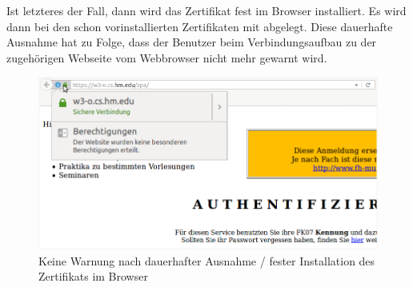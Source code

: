\noindent
Ist letzteres der Fall, dann wird das Zertifikat fest im Browser installiert. Es wird dann bei den schon vorinstallierten Zertifikaten mit abgelegt. Diese dauerhafte Ausnahme hat zu Folge, dass der Benutzer beim Verbindungsaufbau zu der zugehörigen Webseite vom Webbrowser nicht mehr gewarnt wird. 
\begin{figure}[H]
	\centering
	\includegraphics[width=.5\linewidth]{images/trusted_ca.png}
	\caption{Keine Warnung nach dauerhafter Ausnahme / fester Installation des Zertifikats im Browser}
\end{figure}